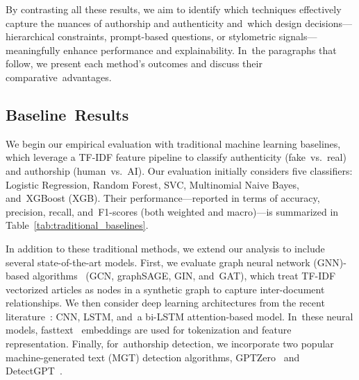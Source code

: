 \documentclass[electronics,article,accept,pdftex,moreauthors,electronics]{Definitions/mdpi}
\begin{document}
By contrasting all these results, we aim to identify which techniques effectively capture the nuances of authorship and authenticity and~which design decisions---hierarchical constraints, prompt-based questions, or stylometric signals---meaningfully enhance performance and explainability. In~the paragraphs that follow, we present each method’s outcomes and discuss their comparative~advantages.


\subsection{Baseline~Results}
\label{sec:res_traditional_baselines}

We begin our empirical evaluation with traditional machine learning baselines, which leverage a TF-IDF feature pipeline to classify authenticity (fake~vs.~real) and authorship (human~vs.~AI). Our evaluation initially considers five classifiers: Logistic Regression, Random Forest, SVC, Multinomial Naive Bayes, and~XGBoost (XGB). Their performance---reported in terms of accuracy, precision, recall, and~F1-scores (both weighted and macro)---is summarized in Table~\ref{tab:traditional_baselines}.

In addition to these traditional methods, we extend our analysis to include several state-of-the-art models. First, we evaluate graph neural network (GNN)-based algorithms~\cite{kuntur2024comparative} (GCN, graphSAGE, GIN, and~GAT), which treat TF-IDF vectorized articles as nodes in a synthetic graph to capture inter-document relationships. We then consider deep learning architectures from the recent literature~\cite{das2025fake,wani2021evaluating}: CNN, LSTM, and~a bi-LSTM attention-based model. In~these neural models, fasttext~\cite{bojanowski2016enriching} embeddings are used for tokenization and feature representation. Finally, for~authorship detection, we incorporate two popular machine-generated text (MGT) detection algorithms, GPTZero~\cite{tian2023gptzero} and DetectGPT~\cite{mitchell_detectgpt_2023}.
\end{document}
